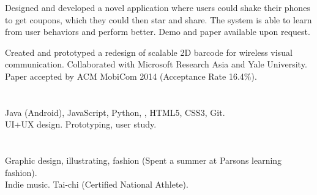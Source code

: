 \begin{resume}

\begin{position}
Designed and developed a novel application where users could shake their phones to get coupons, which they could then star and share. The system is able to learn from user behaviors and perform better. 
Demo and paper available upon request.
\end{position}

\begin{position}
Created and prototyped a redesign of scalable 2D barcode for wireless visual communication. Collaborated with Microsoft Research Asia and Yale University. \\
Paper accepted by ACM MobiCom 2014 (Acceptance Rate 16.4\%).
\end{position}

\section{}
Java (Android), JavaScript, Python, \Cplusplus, HTML5, CSS3, Git.\\
UI+UX design. Prototyping, user study.

\section{}
Graphic design, illustrating, fashion (Spent a summer at Parsons learning fashion). \\
Indie music. Tai-chi (Certified National Athlete).

\end{resume}

